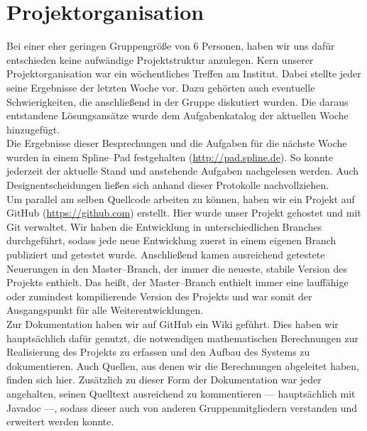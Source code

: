 \section{Projektorganisation}
    
Bei einer eher geringen Gruppengröße von 6 Personen, haben wir uns dafür entschieden keine aufwändige Projektstruktur anzulegen. Kern unserer Projektorganisation war ein wöchentliches Treffen am Institut. Dabei stellte jeder seine Ergebnisse der letzten Woche vor. Dazu gehörten auch eventuelle Schwierigkeiten, die anschließend in der Gruppe diskutiert wurden. Die daraus entstandene Lösungsansätze wurde dem Aufgabenkatalog der aktuellen Woche hinzugefügt.\\
Die Ergebnisse dieser Besprechungen und die Aufgaben für die nächste Woche wurden in einem Spline--Pad festgehalten (\url{http://pad.spline.de}). So konnte jederzeit der aktuelle Stand und anstehende Aufgaben nachgelesen werden. Auch Designentscheidungen ließen sich anhand dieser Protokolle nachvollziehen.\\
Um parallel am selben Quellcode arbeiten zu können, haben wir ein Projekt auf GitHub (\url{https://github.com}) erstellt. Hier wurde unser Projekt gehostet und mit Git verwaltet. Wir haben die Entwicklung in unterschiedlichen Branches durchgeführt, sodass jede neue Entwicklung zuerst in einem eigenen Branch publiziert und getestet wurde. Anschließend kamen ausreichend getestete Neuerungen in den Master--Branch, der immer die neueste, stabile Version des Projekts enthielt. Das heißt, der Master--Branch enthielt immer eine lauffähige oder zumindest kompilierende Version des Projekts und war somit der Ausgangspunkt für alle Weiterentwicklungen.\\
Zur Dokumentation haben wir auf GitHub ein Wiki geführt. Dies haben wir hauptsächlich dafür genutzt, die notwendigen mathematischen Berechnungen zur Realisierung des Projekts zu erfassen und den Aufbau des Systems zu dokumentieren. Auch Quellen, aus denen wir die Berechnungen abgeleitet haben, finden sich hier. Zusätzlich zu dieser Form der Dokumentation war jeder angehalten, seinen Quelltext ausreichend zu kommentieren --- hauptsächlich mit Javadoc ---, sodass dieser auch von anderen Gruppenmitgliedern verstanden und erweitert werden konnte.\\
